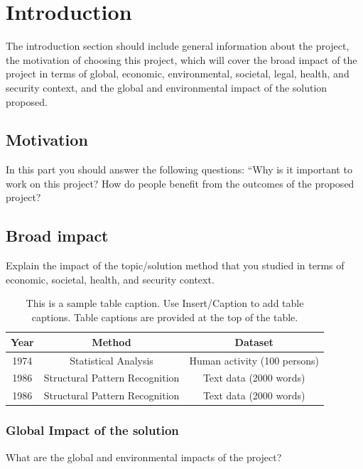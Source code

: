 \documentclass{mefsdp}
\begin{document}
	
	\coverpage
	\descriptivetitle
	\acceptancepage
	\honestypledge
	
	\tableofcontents
	\listoffigures
	\listoftables
	
	
	\section{Introduction}
	
	The introduction section should include general information about the project, the motivation of choosing this project, which will cover the broad impact of the project in terms of global, economic, environmental, societal, legal, health, and security context, and the global and environmental impact of the solution proposed. 
	
	\subsection{Motivation}
	
	In this part you should answer the following questions: “Why is it important to work on this project? How do people benefit from the outcomes of the  proposed project?
	
	\subsection{Broad impact}
	
	Explain the impact of the topic/solution method that you studied in terms of economic, societal, health, and security context. 
	
	\begin{table}[h]
		\centering
		\begin{tabular}{| c | c | c |}
			\hline
			\bfseries Year & \bfseries Method & \bfseries Dataset \\
			\hline
			1974 & Statistical Analysis & Human activity (100 persons) \\
			1986 & Structural Pattern Recognition & Text data (2000 words) \\
			1986 & Structural Pattern Recognition & Text data (2000 words) \\
			\hline
		\end{tabular}
	\caption[First sample table]{This is a sample table caption. Use Insert/Caption to add table captions. Table captions are provided at the top of the table.}
	\end{table}
	
	\subsubsection{Global Impact of the solution}
	What are the global and environmental impacts of the project? 
	
\end{document}
